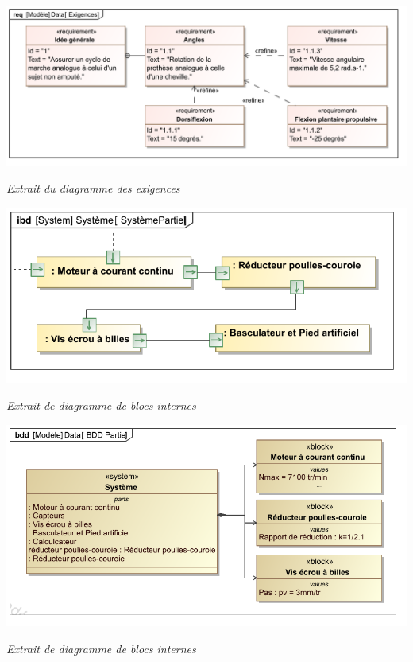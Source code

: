 \documentclass[10pt]{article}
\begin{document}
\begin{minipage}[c]{.49\linewidth}
\begin{center}
\includegraphics[width=\textwidth]{images/Exigences}

\textit{Extrait du diagramme des exigences}
\end{center}

\begin{center}
\includegraphics[width=\textwidth]{images/SystemePartiel}

\textit{Extrait de diagramme de blocs internes}
\end{center}

\end{minipage} \hfill
\begin{minipage}[c]{.49\linewidth}

\begin{center}
\includegraphics[width=\textwidth]{images/BDDPartiel}

\textit{Extrait de diagramme de blocs internes}
\end{center}
\end{minipage}
\end{document}
